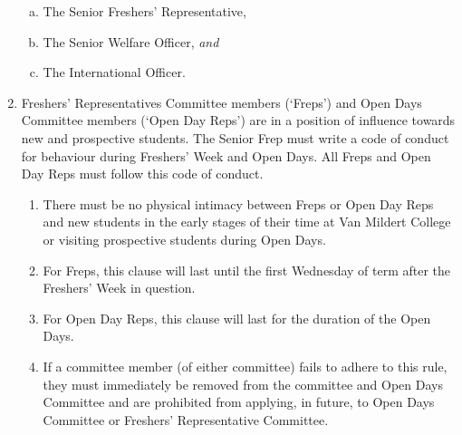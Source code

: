 \documentclass[12pt]{article}
\begin{document}
\begin{enumerate}
\begin{enumerate}[(a)]
        \item The Senior Freshers' Representative,
        \item The Senior Welfare Officer, \emph{and}
        \item The International Officer.
    \end{enumerate}
    \item Freshers’ Representatives Committee members (‘Freps’) and Open Days Committee members (‘Open Day Reps’) are in a position of influence towards new and prospective students. The Senior Frep must write a code of conduct for behaviour during Freshers’ Week and Open Days. All Freps and Open Day Reps must follow this code of conduct.
    \begin{enumerate}
        \item There must be no physical intimacy between Freps or Open Day Reps and new students in the early stages of their time at Van Mildert College or visiting prospective students during Open Days.
        \item For Freps, this clause will last until the first Wednesday of term after the Freshers' Week in question.
        \item For Open Day Reps, this clause will last for the duration of the Open Days.
        \item If a committee member (of either committee) fails to adhere to this rule, they must immediately be removed from the committee and Open Days Committee and are prohibited from applying, in future, to Open Days Committee or Freshers' Representative Committee.
    \end{enumerate}

\end{enumerate}
\end{document}
